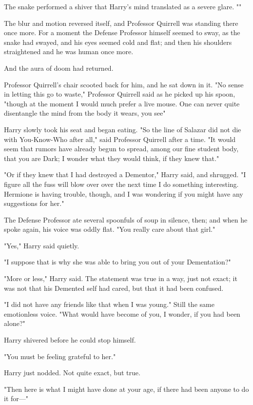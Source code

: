 The snake performed a shiver that Harry's mind translated as a severe glare.
""

The blur and motion reversed itself, and Professor Quirrell was standing there
once more. For a moment the Defense Professor himself seemed to sway, as the
snake had swayed, and his eyes seemed cold and flat; and then his shoulders
straightened and he was human once more.

And the aura of doom had returned.

Professor Quirrell's chair scooted back for him, and he sat down in it. "No
sense in letting this go to waste," Professor Quirrell said as he picked up his
spoon, "though at the moment I would much prefer a live mouse. One can never
quite disentangle the mind from the body it wears, you see{\el}"

Harry slowly took his seat and began eating.
\sbreak
"So the line of Salazar did not die with You-Know-Who after all," said
Professor Quirrell after a time. "It would seem that rumors have already begun
to spread, among our fine student body, that you are Dark; I wonder what they
would think, if they knew that."

"Or if they knew that I had destroyed a Dementor," Harry said, and shrugged. "I
figure all the fuss will blow over over the next time I do something
interesting. Hermione is having trouble, though, and I was wondering if you
might have any suggestions for her."

The Defense Professor ate several spoonfuls of soup in silence, then; and when
he spoke again, his voice was oddly flat. "You really care about that girl."

"Yes," Harry said quietly.

"I suppose that is why she was able to bring you out of your Dementation?"

"More or less," Harry said. The statement was true in a way, just not exact; it
was not that his Demented self had cared, but that it had been confused.

"I did not have any friends like that when I was young." Still the same
emotionless voice. "What would have become of you, I wonder, if you had been
alone?"

Harry shivered before he could stop himself.

"You must be feeling grateful to her."

Harry just nodded. Not quite exact, but true.

"Then here is what I might have done at your age, if there had been anyone to
do it for—"
